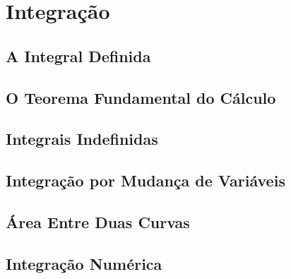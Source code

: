 \chapter{Integração}
\label{chp:integration}

\section{A Integral Definida}
\label{sec:definiteint}

\section{O Teorema Fundamental do Cálculo}
\label{sec:fundamentaltheo}

\section{Integrais Indefinidas}
\label{sec:indefiniteint}

\section{Integração por Mudança de Variáveis}
\label{sec:changevar}

\section{Área Entre Duas Curvas}
\label{sec:areacurves}

\section{Integração Numérica}
\label{sec:numericalint}

\begin{chapterproblems}
\end{chapterproblems}


